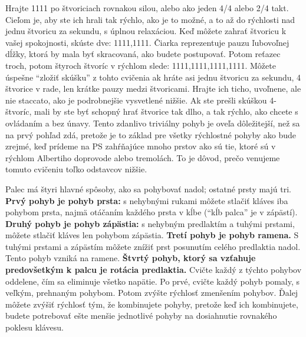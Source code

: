 Hrajte 1111 po štvoriciach rovnakou silou, alebo ako jeden 4/4 alebo 2/4 takt. Cieľom je, aby ste ich hrali tak rýchlo, ako je to možné, a to až do rýchlosti nad jednu štvoricu za sekundu, s úplnou relaxáciou. Keď môžete zahrať štvoricu k vašej spokojnosti, skúste dve: 1111,1111. Čiarka reprezentuje pauzu ľubovoľnej dĺžky, ktorá by mala byť skracovaná, ako budete postupovať. Potom reťazec troch, potom štyroch štvoríc v rýchlom slede: 1111,1111,1111,1111. Môžete úspešne “zložiť skúšku” z tohto cvičenia ak hráte asi jednu štvoricu za sekundu, 4 štvorice v rade, len krátke pauzy medzi štvoricami. Hrajte ich ticho, uvoľnene, ale nie staccato, ako je podrobnejšie vysvetlené nižšie. Ak ste prešli skúškou 4-štvoríc, mali by ste byť schopný hrať štvorice tak dlho, a tak rýchlo, ako chcete s ovládaním a bez únavy. Tento zdanlivo triviálny pohyb je oveľa dôležitejší, než sa na prvý pohľad zdá, pretože je to základ pre všetky rýchlostné pohyby ako bude zrejmé, keď prídeme na PS zahŕňajúce mnoho prstov ako sú tie, ktoré sú v rýchlom Albertiho doprovode alebo tremolách. To je dôvod, prečo venujeme tomuto cvičeniu toľko odstavcov nižšie.

Palec má štyri hlavné spôsoby, ako sa pohybovať nadol; ostatné prsty majú tri. \textbf{Prvý pohyb je pohyb prsta:} s nehybnými rukami môžete stlačiť kláves iba pohybom prsta, najmä otáčaním každého prsta v kĺbe (“kĺb palca” je v zápästí). \textbf{Druhý pohyb je pohyb zápästia:} s nehybným predlaktím a tuhými prstami, môžete stlačiť kláves len pohybom zápästia. \textbf{Tretí pohyb je pohyb ramena.} S tuhými prstami a zápästím môžete znížiť prst posunutím celého predlaktia nadol. Tento pohyb vzniká na ramene. \textbf{Štvrtý pohyb, ktorý sa vzťahuje predovšetkým k palcu je rotácia predlaktia.} Cvičte každý z týchto pohybov oddelene, čím sa eliminuje všetko napätie. Po prvé, cvičte každý pohyb pomaly, s veľkým, prehnaným pohybom. Potom zvýšte rýchlosť zmenšením pohybov. Ďalej môžete zvýšiť rýchlosť tým, že kombinujete pohyby, pretože keď ich kombinujete, budete potrebovať ešte menšie jednotlivé pohyby na dosiahnutie rovnakého poklesu klávesu.

